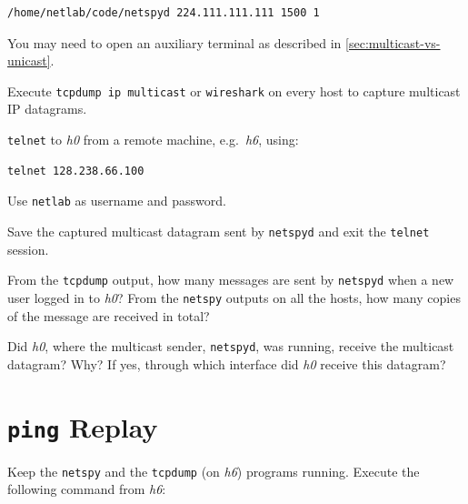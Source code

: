 \documentclass{../UTNetLab}
\begin{document}
\begin{lstlisting}
/home/netlab/code/netspyd 224.111.111.111 1500 1
    \end{lstlisting}
You may need to open an auxiliary terminal as described in \autoref{sec:multicast-vs-unicast}.

Execute \lstinline{tcpdump ip multicast} or \lstinline{wireshark} on every host to capture multicast IP datagrams.


\lstinline{telnet} to \textit{h0} from a remote machine, e.g.\ \textit{h6}, using:

\begin{lstlisting}
telnet 128.238.66.100
    \end{lstlisting}
Use \texttt{netlab} as username and password.

Save the captured multicast datagram sent by \lstinline{netspyd} and exit the \lstinline{telnet} session.

\begin{report}
    \item From the \lstinline{tcpdump} output, how many messages are sent by \lstinline{netspyd} when a new user logged in to \textit{h0}?
    From the \lstinline{netspy} outputs on all the hosts, how many copies of the message are received in total?

    \item Did \textit{h0}, where the multicast sender, \lstinline{netspyd}, was running, receive the multicast datagram?
    Why?
    If yes, through which interface did \textit{h0} receive this datagram?
\end{report}

\section{\texttt{ping} Replay}
Keep the \lstinline{netspy} and the \lstinline{tcpdump} (on \textit{h6}) programs running.
Execute the following command from \textit{h6}:
\end{document}
